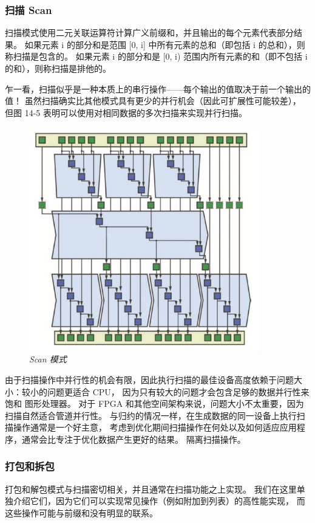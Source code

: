 \subsubsection{扫描 Scan}
扫描模式使用二元关联运算符计算广义前缀和，并且输出的每个元素代表部分结果。 
如果元素 i 的部分和是范围 [0, i] 中所有元素的总和（即包括 i 的总和），则称扫描是包含的。 
如果元素 i 的部分和是 [0, i) 范围内所有元素的和（即不包括 i 的和），则称扫描是排他的。

乍一看，扫描似乎是一种本质上的串行操作——每个输出的值取决于前一个输出的值！ 
虽然扫描确实比其他模式具有更少的并行机会（因此可扩展性可能较差），
但图 14-5 表明可以使用对相同数据的多次扫描来实现并行扫描。

\begin{figure}[H]
	\centering
	\includegraphics[width=0.9\textwidth]{figs/F14.5.png}
	\caption{\textit{Scan 模式 }}
\end{figure}

由于扫描操作中并行性的机会有限，因此执行扫描的最佳设备高度依赖于问题大小：较小的问题更适合 CPU，
因为只有较大的问题才会包含足够的数据并行性来饱和 图形处理器。 
对于 FPGA 和其他空间架构来说，问题大小不太重要，因为扫描自然适合管道并行性。 
与归约的情况一样，在生成数据的同一设备上执行扫描操作通常是一个好主意，
考虑到优化期间扫描操作在何处以及如何适应应用程序，通常会比专注于优化数据产生更好的结果。 隔离扫描操作。

\subsubsection{打包和拆包}
打包和解包模式与扫描密切相关，并且通常在扫描功能之上实现。 
我们在这里单独介绍它们，因为它们可以实现常见操作（例如附加到列表）的高性能实现，
而这些操作可能与前缀和没有明显的联系。

